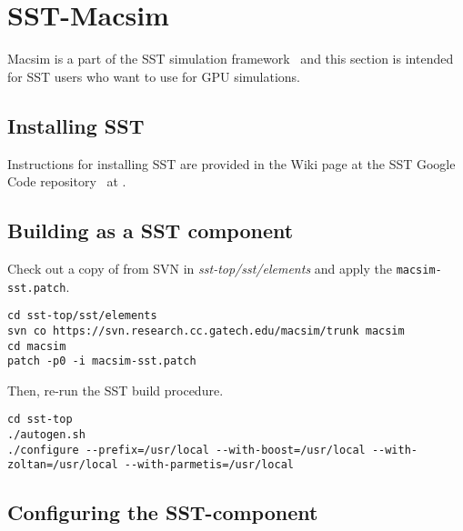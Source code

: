 \section{SST-Macsim}
\label{sec:sst}


Macsim is a part of the SST simulation framework~\cite{sst} and this section is
intended for SST users who want to use \SIM for GPU simulations.


\subsection{Installing SST}


Instructions for installing SST are provided in the Wiki
page at the SST Google Code repository~\cite{sst-google} at
.


\subsection{Building \SIM as a SST component}


Check out a copy of \SIM from SVN in \textit{sst-top/sst/elements} and
apply the \Verb+macsim-sst.patch+. 

\begin{Verbatim}
cd sst-top/sst/elements
svn co https://svn.research.cc.gatech.edu/macsim/trunk macsim
cd macsim
patch -p0 -i macsim-sst.patch
\end{Verbatim}

Then, re-run the SST build procedure.

\begin{Verbatim}
cd sst-top
./autogen.sh
./configure --prefix=/usr/local --with-boost=/usr/local --with-zoltan=/usr/local --with-parmetis=/usr/local
\end{Verbatim}


\subsection{Configuring the SST-\SIM component}

